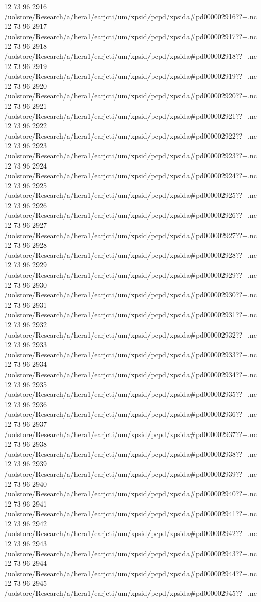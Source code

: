 12 73 96
2916
/uolstore/Research/a/hera1/earjcti/um/xpsid/pcpd/xpsida#pd000002916??+.nc
12 73 96
2917
/uolstore/Research/a/hera1/earjcti/um/xpsid/pcpd/xpsida#pd000002917??+.nc
12 73 96
2918
/uolstore/Research/a/hera1/earjcti/um/xpsid/pcpd/xpsida#pd000002918??+.nc
12 73 96
2919
/uolstore/Research/a/hera1/earjcti/um/xpsid/pcpd/xpsida#pd000002919??+.nc
12 73 96
2920
/uolstore/Research/a/hera1/earjcti/um/xpsid/pcpd/xpsida#pd000002920??+.nc
12 73 96
2921
/uolstore/Research/a/hera1/earjcti/um/xpsid/pcpd/xpsida#pd000002921??+.nc
12 73 96
2922
/uolstore/Research/a/hera1/earjcti/um/xpsid/pcpd/xpsida#pd000002922??+.nc
12 73 96
2923
/uolstore/Research/a/hera1/earjcti/um/xpsid/pcpd/xpsida#pd000002923??+.nc
12 73 96
2924
/uolstore/Research/a/hera1/earjcti/um/xpsid/pcpd/xpsida#pd000002924??+.nc
12 73 96
2925
/uolstore/Research/a/hera1/earjcti/um/xpsid/pcpd/xpsida#pd000002925??+.nc
12 73 96
2926
/uolstore/Research/a/hera1/earjcti/um/xpsid/pcpd/xpsida#pd000002926??+.nc
12 73 96
2927
/uolstore/Research/a/hera1/earjcti/um/xpsid/pcpd/xpsida#pd000002927??+.nc
12 73 96
2928
/uolstore/Research/a/hera1/earjcti/um/xpsid/pcpd/xpsida#pd000002928??+.nc
12 73 96
2929
/uolstore/Research/a/hera1/earjcti/um/xpsid/pcpd/xpsida#pd000002929??+.nc
12 73 96
2930
/uolstore/Research/a/hera1/earjcti/um/xpsid/pcpd/xpsida#pd000002930??+.nc
12 73 96
2931
/uolstore/Research/a/hera1/earjcti/um/xpsid/pcpd/xpsida#pd000002931??+.nc
12 73 96
2932
/uolstore/Research/a/hera1/earjcti/um/xpsid/pcpd/xpsida#pd000002932??+.nc
12 73 96
2933
/uolstore/Research/a/hera1/earjcti/um/xpsid/pcpd/xpsida#pd000002933??+.nc
12 73 96
2934
/uolstore/Research/a/hera1/earjcti/um/xpsid/pcpd/xpsida#pd000002934??+.nc
12 73 96
2935
/uolstore/Research/a/hera1/earjcti/um/xpsid/pcpd/xpsida#pd000002935??+.nc
12 73 96
2936
/uolstore/Research/a/hera1/earjcti/um/xpsid/pcpd/xpsida#pd000002936??+.nc
12 73 96
2937
/uolstore/Research/a/hera1/earjcti/um/xpsid/pcpd/xpsida#pd000002937??+.nc
12 73 96
2938
/uolstore/Research/a/hera1/earjcti/um/xpsid/pcpd/xpsida#pd000002938??+.nc
12 73 96
2939
/uolstore/Research/a/hera1/earjcti/um/xpsid/pcpd/xpsida#pd000002939??+.nc
12 73 96
2940
/uolstore/Research/a/hera1/earjcti/um/xpsid/pcpd/xpsida#pd000002940??+.nc
12 73 96
2941
/uolstore/Research/a/hera1/earjcti/um/xpsid/pcpd/xpsida#pd000002941??+.nc
12 73 96
2942
/uolstore/Research/a/hera1/earjcti/um/xpsid/pcpd/xpsida#pd000002942??+.nc
12 73 96
2943
/uolstore/Research/a/hera1/earjcti/um/xpsid/pcpd/xpsida#pd000002943??+.nc
12 73 96
2944
/uolstore/Research/a/hera1/earjcti/um/xpsid/pcpd/xpsida#pd000002944??+.nc
12 73 96
2945
/uolstore/Research/a/hera1/earjcti/um/xpsid/pcpd/xpsida#pd000002945??+.nc
